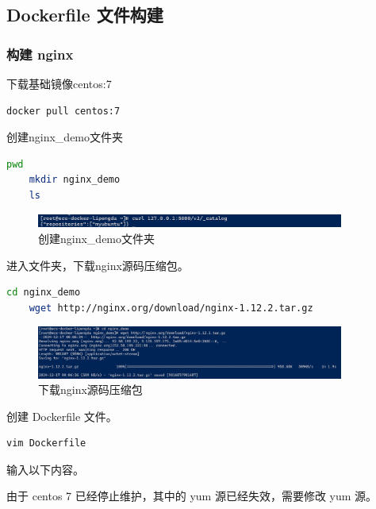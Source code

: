 \documentclass{article}
\begin{document}
\subsection{Dockerfile 文件构建}

\subsubsection{构建 nginx}

下载基础镜像centos:7

\begin{lstlisting}[language=bash]
    docker pull centos:7
\end{lstlisting}

创建nginx\_demo文件夹

\begin{lstlisting}[language=bash]
    pwd
    mkdir nginx_demo
    ls
\end{lstlisting}

\begin{figure}[H]
\centering
\includegraphics[width=0.9\textwidth]{img/0.2.5.1.5.png}
\caption{创建nginx\_demo文件夹}
\end{figure}

进入文件夹，下载nginx源码压缩包。

\begin{lstlisting}[language=bash]
    cd nginx_demo
    wget http://nginx.org/download/nginx-1.12.2.tar.gz
\end{lstlisting}

\begin{figure}[H]
\centering
\includegraphics[width=0.9\textwidth]{img/2.7.1.2.png}
\caption{下载nginx源码压缩包}
\end{figure}

创建 Dockerfile 文件。

\begin{lstlisting}[language=bash]
    vim Dockerfile
\end{lstlisting}

输入以下内容。

由于 centos 7 已经停止维护，其中的 yum 源已经失效，需要修改 yum 源。
\end{document}
